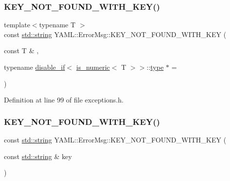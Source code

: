 \subsubsection{\texorpdfstring{KEY\_NOT\_FOUND\_WITH\_KEY()}{KEY\_NOT\_FOUND\_WITH\_KEY()}\hspace{0.1cm}{\footnotesize\ttfamily [1/3]}}
{\footnotesize\ttfamily template$<$typename T $>$ \\
const \mbox{\hyperlink{glad_8h_ac83513893df92266f79a515488701770}{std\+::string}} Y\+A\+M\+L\+::\+Error\+Msg\+::\+K\+E\+Y\+\_\+\+N\+O\+T\+\_\+\+F\+O\+U\+N\+D\+\_\+\+W\+I\+T\+H\+\_\+\+K\+EY (\begin{DoxyParamCaption}\item[{const T \&}]{,  }\item[{typename \mbox{\hyperlink{struct_y_a_m_l_1_1disable__if}{disable\+\_\+if}}$<$ \mbox{\hyperlink{struct_y_a_m_l_1_1is__numeric}{is\+\_\+numeric}}$<$ T $>$$>$\+::\mbox{\hyperlink{glad_8h_a890efa53b3d7deeeced6f3a0d6653ed3}{type}} $\ast$}]{ = {} }\end{DoxyParamCaption})\hspace{0.3cm}{\ttfamily [inline]}}



Definition at line 99 of file exceptions.\+h.

\mbox{\label{namespace_y_a_m_l_1_1_error_msg_a0b54f28d4dde5446cff6430ef9fee9ab}} 
\subsubsection{\texorpdfstring{KEY\_NOT\_FOUND\_WITH\_KEY()}{KEY\_NOT\_FOUND\_WITH\_KEY()}\hspace{0.1cm}{\footnotesize\ttfamily [2/3]}}
{\footnotesize\ttfamily const \mbox{\hyperlink{glad_8h_ac83513893df92266f79a515488701770}{std\+::string}} Y\+A\+M\+L\+::\+Error\+Msg\+::\+K\+E\+Y\+\_\+\+N\+O\+T\+\_\+\+F\+O\+U\+N\+D\+\_\+\+W\+I\+T\+H\+\_\+\+K\+EY (\begin{DoxyParamCaption}\item[{const \mbox{\hyperlink{glad_8h_ac83513893df92266f79a515488701770}{std\+::string}} \&}]{key }\end{DoxyParamCaption})\hspace{0.3cm}{\ttfamily [inline]}}



